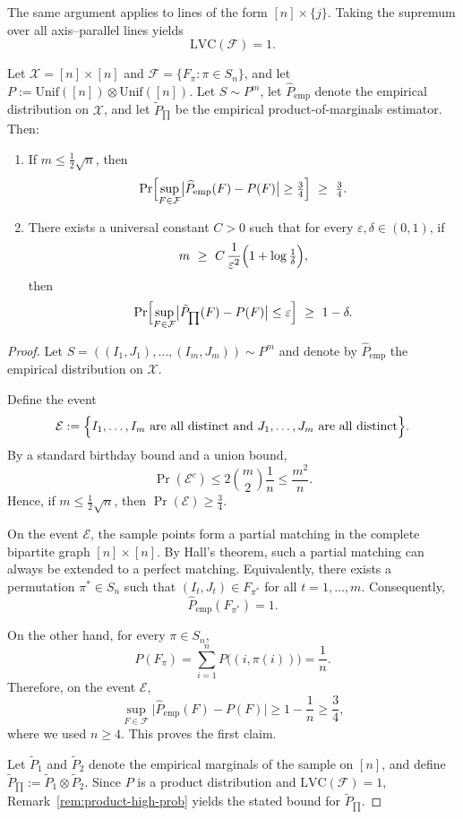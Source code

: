 \documentclass[arxiv]{colt2026}
\newcommand{\X}{\mathcal{X}}
\newcommand{\F}{\mathcal{F}}
\newcommand{\eps}{\varepsilon}
\newcommand{\LVC}{\mathrm{LVC}}
\newcommand{\Unif}{\mathrm{Unif}}
\begin{document}
The same argument applies to lines of the form $[n]\times\{j\}$.
Taking the supremum over all axis--parallel lines yields
\[
\LVC(\F)=1.
\]

\begin{lemma}
Let $\X=[n]\times[n]$ and $\F=\{F_\pi:\pi\in S_n\}$, and let
$P:=\Unif([n])\otimes\Unif([n])$.
Let $S\sim P^{m}$, let $\widehat P_{\mathrm{emp}}$ denote the empirical
distribution on $\X$, and let $\tilde P_{\prod}$ be the empirical
product-of-marginals estimator.
Then:
\begin{enumerate}
\item If $m\le \tfrac12\sqrt n$, then
\[
\Pr\Bigl[
\sup_{F\in\F}\bigl|\widehat P_{\mathrm{emp}}(F)-P(F)\bigr|\ge \tfrac34
\Bigr]
\ \ge\ \tfrac34.
\]
\item There exists a universal constant $C>0$ such that for every
$\eps,\delta\in(0,1)$, if
\[
 m\ \ge\ C\,\frac{1}{\eps^2}\Bigl(1+\log\tfrac{1}{\delta}\Bigr),
\]
then
\[
\Pr\Bigl[
\sup_{F\in\F}\bigl|\tilde P_{\prod}(F)-P(F)\bigr|\le \eps
\Bigr]
\ \ge\ 1-\delta.
\]
\end{enumerate}
\end{lemma}

\begin{proof}
Let
$S=((I_1,J_1),\ldots,(I_m,J_m))\sim P^{m}$
and denote by
$\widehat P_{\mathrm{emp}}$ the empirical distribution on $\X$.

Define the event
\[
\mathcal E
:=\Bigl\{ I_1,\ldots,I_m \text{ are all distinct and }
          J_1,\ldots,J_m \text{ are all distinct} \Bigr\}.
\]
By a standard birthday bound and a union bound,
\[
\Pr(\mathcal E^c)
\le
2\binom{m}{2}\frac1n
\le \frac{m^2}{n}.
\]
Hence, if $m\le \tfrac12\sqrt n$, then $\Pr(\mathcal E)\ge \tfrac34$.

On the event $\mathcal E$, the sample points form a partial matching in the
complete bipartite graph $[n]\times[n]$.
By Hall’s theorem, such a partial matching can always be extended to a perfect
matching.
Equivalently, there exists a permutation $\pi^*\in S_n$ such that
$(I_t,J_t)\in F_{\pi^*}$ for all $t=1,\ldots,m$.
Consequently,
\[
\widehat P_{\mathrm{emp}}(F_{\pi^*})=1.
\]

On the other hand, for every $\pi\in S_n$,
\[
P(F_\pi)=\sum_{i=1}^n P\bigl((i,\pi(i))\bigr)=\frac1n.
\]
Therefore, on the event $\mathcal E$,
\[
\sup_{F\in\F}\bigl|\widehat P_{\mathrm{emp}}(F)-P(F)\bigr|
\ge
1-\frac1n
\ge \frac34,
\]
where we used $n\ge 4$.
This proves the first claim.

Let $\tilde P_1$ and $\tilde P_2$ denote the empirical marginals of the sample on
$[n]$, and define
\(
\tilde P_{\prod} := \tilde P_1\otimes \tilde P_2.
\)
Since $P$ is a product distribution and $\LVC(\F)=1$,
Remark~\ref{rem:product-high-prob} yields the stated bound for
$\tilde P_{\prod}$.
\end{proof}
\end{document}
